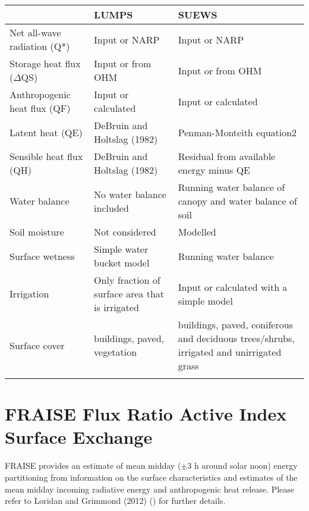 \documentclass[letterpaper,10pt,english]{sphinxmanual}
\begin{document}
\begin{savenotes}\sphinxattablestart
\centering
\begin{tabulary}{\linewidth}[t]{|T|T|T|}
\hline
\sphinxstyletheadfamily &\sphinxstyletheadfamily 
LUMPS
&\sphinxstyletheadfamily 
SUEWS
\\
\hline
Net all-wave
radiation (Q*)
&
Input or NARP
&
Input or NARP
\\
\hline
Storage heat flux
(\(\Delta\)QS)
&
Input or from OHM
&
Input or from OHM
\\
\hline
Anthropogenic heat
flux (QF)
&
Input or calculated
&
Input or calculated
\\
\hline
Latent heat (QE)
&
DeBruin and Holtslag
(1982)
&
Penman-Monteith
equation2
\\
\hline
Sensible heat flux
(QH)
&
DeBruin and Holtslag
(1982)
&
Residual from
available energy
minus QE
\\
\hline
Water balance
&
No water balance
included
&
Running water balance
of canopy and water
balance of soil
\\
\hline
Soil moisture
&
Not considered
&
Modelled
\\
\hline
Surface wetness
&
Simple water bucket
model
&
Running water balance
\\
\hline
Irrigation
&
Only fraction of
surface area that is
irrigated
&
Input or calculated
with a simple model
\\
\hline
Surface cover
&
buildings, paved,
vegetation
&
buildings, paved,
coniferous and
deciduous
trees/shrubs,
irrigated and
unirrigated grass
\\
\hline&&\\
\hline
\end{tabulary}
\par
\sphinxattableend\end{savenotes}


\section{FRAISE Flux Ratio \textendash{} Active Index Surface Exchange}
\label{\detokenize{differences-suews-lumps-fraise:fraise-flux-ratio-active-index-surface-exchange}}
FRAISE provides an estimate of mean midday (\(\pm\)3 h around solar noon)
energy partitioning from information on the surface characteristics and
estimates of the mean midday incoming radiative energy and anthropogenic
heat release. Please refer to Loridan and Grimmond (2012) \label{\detokenize{differences-suews-lumps-fraise:id1}}{\hyperref[\detokenize{references:lg2012}]{\sphinxcrossref{{[}LG2012{]}}}} () for
further details.
\end{document}

